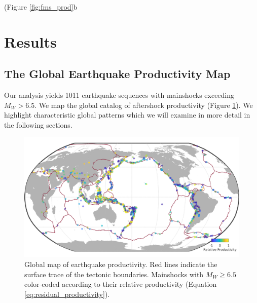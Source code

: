 \documentclass[draft, jgrga]{agujournal2018}
\begin{document}
 (Figure \ref{fig:fms_prod}b  

\section{Results}
    \subsection{The Global Earthquake Productivity Map}\label{sec:glob}
    
    Our analysis yields 1011 earthquake sequences with mainshocks exceeding $M_W>6.5$. We map the global catalog of aftershock productivity (Figure \ref{fig:global_res}). We highlight characteristic global patterns which we will examine in more detail in the following sections.
    
    \begin{figure}
    \includegraphics[width = \linewidth]{figures/worldmap_res.png}
        \caption{Global map of earthquake productivity. Red lines indicate the surface trace of the tectonic boundaries. Mainshocks with $M_W\ge6.5$ color-coded according to their relative productivity (Equation \ref{eq:residual_productivity}).
        } 
        \label{fig:global_res}
    \end{figure}
\end{document}

